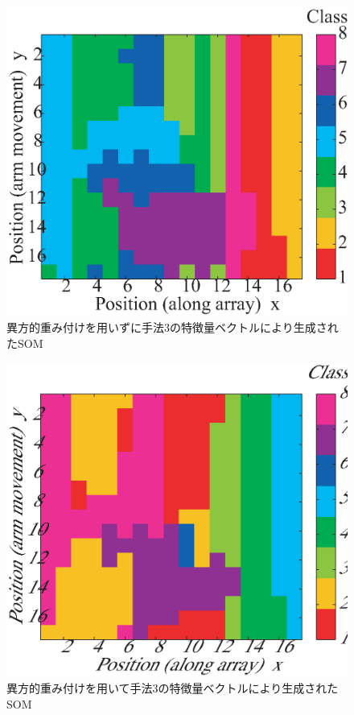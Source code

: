﻿\documentclass[12pt,oneside]{jsbook}
\begin{document}
\begin{figure}[btp]
\includegraphics[width =\hsize ]{SOM_170131_wow_wh5_d7.eps}
\caption{異方的重み付けを用いずに手法3の特徴量ベクトルにより生成されたSOM}
\label{vector3-som-wow}
\end{figure}

\begin{figure}[btp]
\includegraphics[width =\hsize ]{SOM_170131_wh5_d7.eps}
\caption{異方的重み付けを用いて手法3の特徴量ベクトルにより生成されたSOM}
\label{vector3-som}
\end{figure}
\end{document}

